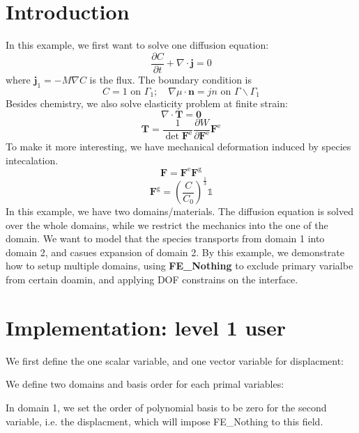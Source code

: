 \hypertarget{growth_Introduction}{}\section{Introduction}\label{growth_Introduction}
In this example, we first want to solve one diffusion equation\+: \[ \frac{\partial C}{\partial t}+\nabla\cdot\boldsymbol{j}=0 \] where $\boldsymbol{j}_1=-M\nabla C$ is the flux. The boundary condition is \[ C=1 \text{ on }\Gamma_1; \quad \nabla \mu\cdot\boldsymbol{n}=jn \text{ on }\Gamma \backslash \Gamma_1 \] Besides chemistry, we also solve elasticity problem at finite strain\+: \[ \nabla\cdot\boldsymbol{T} = \boldsymbol{0} \] \[ \boldsymbol{T}= \frac{1}{\det{\boldsymbol{F}^{\text{e}}}}\frac{\partial W}{\partial \boldsymbol{F}^{\text{e}}}\boldsymbol{F}^{\text{e}} \] To make it more interesting, we have mechanical deformation induced by species intecalation. \[ \boldsymbol{F}=\boldsymbol{F}^{\text{e}}\boldsymbol{F}^{\text{g}} \] \[ \boldsymbol{F}^{\text{g}}=\left(\frac{C}{C_\text{0}}\right)^{\frac{1}{3}}\mathbb{1} \] In this example, we have two domains/materials. The diffusion equation is solved over the whole domains, while we restrict the mechanics into the one of the domain. We want to model that the species transports from domain 1 into domain 2, and casues expansion of domain 2. By this example, we demonstrate how to setup multiple domains, using {\bfseries{F\+E\+\_\+\+Nothing}} to exclude primary varialbe from certain doamin, and applying D\+OF constrains on the interface.

 \hypertarget{growth_imple}{}\section{Implementation\+: level 1 user}\label{growth_imple}
We first define the one scalar variable, and one vector variable for displacment\+: 
\begin{DoxyCode}{0}
\end{DoxyCode}
 We define two domains and basis order for each primal variables\+: 
\begin{DoxyCode}{0}
\end{DoxyCode}
 In domain 1, we set the order of polynomial basis to be zero for the second variable, i.\+e. the displacment, which will impose F\+E\+\_\+\+Nothing to this field.

